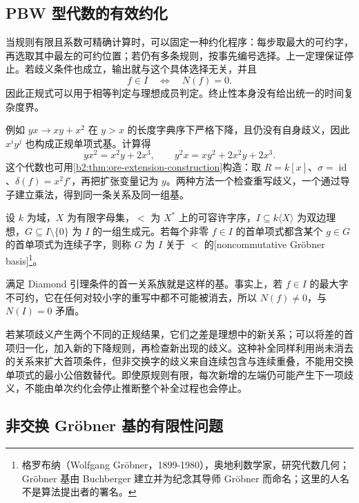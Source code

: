 \subsection{PBW 型代数的有效约化}
\label{b2:subsec:2006:03}

当规则有限且系数可精确计算时，可以固定一种约化程序：每步取最大的可约字，再选取其中最左的可约位置；若仍有多条规则，按事先编号选择。上一定理保证停止。若歧义条件也成立，输出就与这个具体选择无关，并且
\[
	f\in I\quad\Longleftrightarrow\quad N(f)=0.
\]
因此正规式可以用于相等判定与理想成员判定。终止性本身没有给出统一的时间复杂度界。

\ProseParagraphBreak
例如 \(yx\to xy+x^2\) 在 \(y>x\) 的长度字典序下严格下降，且仍没有自身歧义，因此 \(x^iy^j\) 也构成正规单项式基。计算得
\[
	yx^2=x^2y+2x^3,\qquad y^2x=xy^2+2x^2y+2x^3.
\]
这个代数也可用\cref{b2:thm:ore-extension-construction}构造：取 \(R=k[x]\)、\(\sigma=\operatorname{id}\)、\(\delta(f)=x^2f'\)，再把扩张变量记为 \(y\)。两种方法一个检查重写歧义，一个通过导子建立乘法，得到同一条关系及同一组基。

\begin{definition}\label{b2:def:noncommutative-groebner-basis}
	设 \(k\) 为域，\(X\) 为有限字母集，\(<\) 为 \(X^*\) 上的可容许字序，\(I\subseteq k\langle X\rangle\) 为双边理想，\(G\subseteq I\setminus\{0\}\) 为 \(I\) 的一组生成元。若每个非零 \(f\in I\) 的首单项式都含某个 \(g\in G\) 的首单项式为连续子字，则称 \(G\) 为 \(I\) 关于 \(<\) 的[noncommutative Gröbner basis]\footnote{格罗布纳（Wolfgang Gröbner，1899-1980），奥地利数学家，研究代数几何；Gröbner 基由 Buchberger 建立并为纪念其导师 Gröbner 而命名；这里的人名不是算法提出者的署名。}。
\end{definition}

满足 Diamond 引理条件的首一关系族就是这样的基。事实上，若 \(f\in I\) 的最大字不可约，它在任何对较小字的重写中都不可能被消去，所以 \(N(f)\ne0\)，与 \(N(I)=0\) 矛盾。

\ProseParagraphBreak
若某项歧义产生两个不同的正规结果，它们之差是理想中的新关系；可以将差的首项归一化，加入新的下降规则，再检查新出现的歧义。这种补全同样利用尚未消去的关系来扩大首项条件，但非交换字的歧义来自连续包含与连续重叠，不能用交换单项式的最小公倍数替代。即使原规则有限，每次新增的左端仍可能产生下一项歧义，不能由单次约化会停止推断整个补全过程也会停止。

\subsection{非交换 Gröbner 基的有限性问题}
\label{b2:subsec:2006:04}


